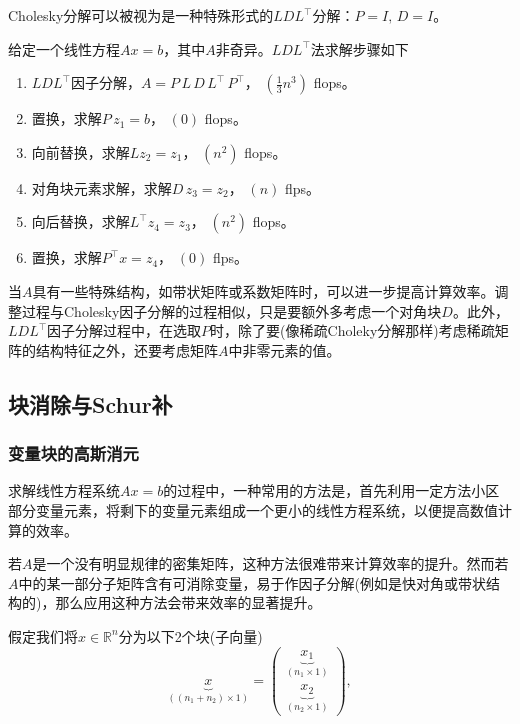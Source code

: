 Cholesky分解可以被视为是一种特殊形式的$LDL^{\top}$分解：$P=I, \, D = I$。

\begin{algorithm}
  \label{algorithm:numlin-factorization-ldl}
  给定一个线性方程$A x = b$，其中$A$非奇异。$LDL^{\top}$法求解步骤如下
  \begin{enumerate}
    \item $LDL^{\top}$因子分解，$A = P \, L \, D \, L^{\top} \, P^{\top}$， $\left( \frac{1}{3} n^{3} \right)$ flops。
    \item 置换，求解$P \, z_{1} = b$， $\left( 0 \right)$ flops。
    \item 向前替换，求解$L z_{2} = z_{1}$， $\left( n^{2} \right)$ flops。
    \item 对角块元素求解，求解$D \, z_{3} = z_{2}$， $\left( n \right)$ flps。
    \item 向后替换，求解$L^{\top} z_{4} = z_{3}$， $\left( n^{2} \right)$ flops。
    \item 置换，求解$P^{\top} x = z_{4}$， $\left( 0 \right)$ flps。
  \end{enumerate}
\end{algorithm}

当$A$具有一些特殊结构，如带状矩阵或系数矩阵时，可以进一步提高计算效率。调整过程与Cholesky因子分解的过程相似，只是要额外多考虑一个对角块$D$。此外，$LDL^{\top}$因子分解过程中，在选取$P$时，除了要(像稀疏Choleky分解那样)考虑稀疏矩阵的结构特征之外，还要考虑矩阵$A$中非零元素的值。

\subsection{块消除与Schur补}
\label{sec:numlin-block-elimination}

\subsubsection{变量块的高斯消元}
\label{sec:numlin-gaussian-elimination}
求解线性方程系统$A x = b$的过程中，一种常用的方法是，首先利用一定方法小区部分变量元素，将剩下的变量元素组成一个更小的线性方程系统，以便提高数值计算的效率。

若$A$是一个没有明显规律的密集矩阵，这种方法很难带来计算效率的提升。然而若$A$中的某一部分子矩阵含有可消除变量，易于作因子分解(例如是快对角或带状结构的)，那么应用这种方法会带来效率的显著提升。

假定我们将$x \in \mathbb{R}^{n}$分为以下2个块(子向量)
\begin{equation*}
  \underbrace{x}_{\left( \left( n_{1} + n_{2} \right) \times 1 \right)} =
  \begin{pmatrix}
  \underbrace{x_{1}}_{\left( n_{1} \times 1 \right)} \\
  \underbrace{x_{2}}_{\left( n_{2} \times 1 \right)}
  \end{pmatrix},
\end{equation*}


